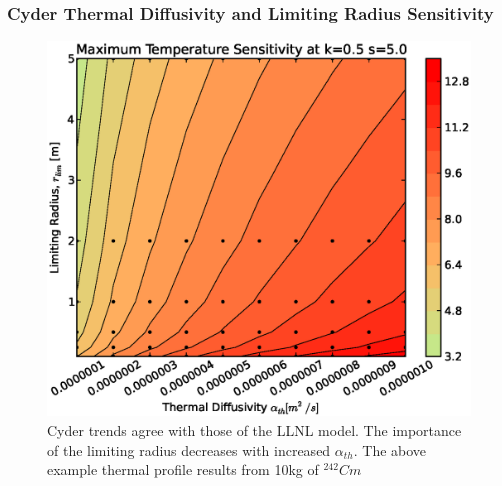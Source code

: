 \begin{frame}[ctb!]
\frametitle{Cyder Thermal Diffusivity and Limiting Radius Sensitivity}
\footnotesize{
\begin{figure}[htbp!]
\begin{center}
\includegraphics[height=0.7\textheight]{./thermal_demonstration/diffusivity/ar.eps}
\end{center}
\caption[$\alpha_{th}$ vs. $r_{lim}$ Sensitivity in Cyder]
{Cyder trends agree with 
those of the LLNL model. The importance of the limiting radius decreases with 
increased $\alpha_{th}$. The above example thermal profile results from 10kg of 
$^{242}Cm$}
\label{fig:ak}
\end{figure}
}
\end{frame}
